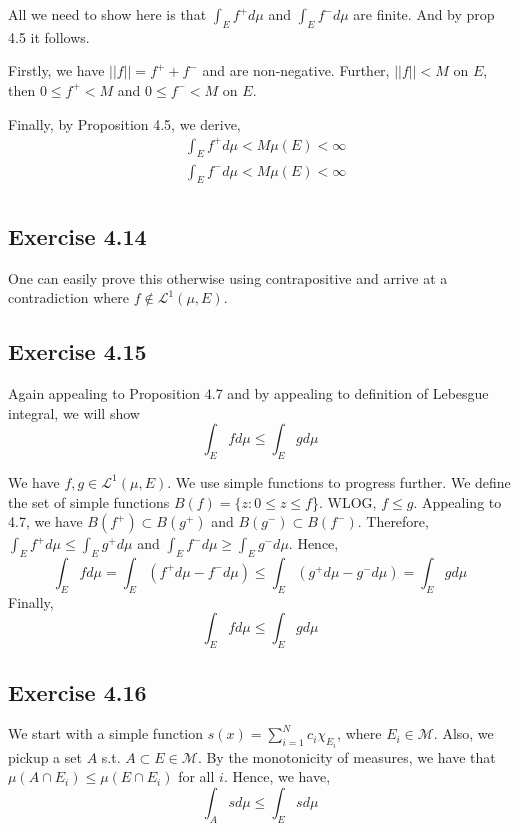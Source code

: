 \documentclass[12pt]{article}
\begin{document}
All we need to show here is that $\int_E f^+ d\mu$ and $\int_E f^- d\mu$ are finite. And by prop 4.5 it follows.

Firstly, we have $||f|| = f^+ + f^-$ and are non-negative. Further, $||f|| < M$ on $E$, then $0 \leq f^+ < M$ and $0 \leq f^- < M$ on $E$.

Finally, by Proposition 4.5, we derive,
\begin{align*}
&\int_E f^+ d\mu < M \mu(E) < \infty \\
&\int_E f^- d\mu < M \mu(E) < \infty \\
\end{align*}


\subsection{Exercise 4.14}
One can easily prove this otherwise using contrapositive and arrive at a contradiction where  $f \not\in \mathscr{L}^1(\mu,E)$.

\subsection{Exercise 4.15}

Again appealing to Proposition 4.7 and by appealing to definition of Lebesgue integral, we will show
\begin{equation}
\int_E fd\mu \leq \int_E g d\mu
\end{equation}

\vskip 1cm
We have $f,g \in \mathscr{L}^1(\mu,E)$. We use simple functions to progress further. We define the set of simple functions $B(f) = \{ z : 0 \leq z \leq f$\}. WLOG, $f \leq g$. Appealing to 4.7, we have $B(f^+) \subset B(g^+)$ and $B(g^-) \subset B(f^-)$. Therefore, $ \int_E f^+ d\mu \leq \int_E g^+ d\mu$ and $\int_E f^- d\mu \geq \int_E g^- d\mu$. Hence,
\begin{equation}
\int_E fd\mu = \int_E (f^+ d\mu -  f^- d\mu) \leq \int_E (g^+ d\mu -g^- d\mu) = \int_E g d\mu
\end{equation}
Finally,
\begin{equation}
\int_E fd\mu \leq \int_E g d\mu
\end{equation}



\subsection{Exercise 4.16}

We start with a simple function $s(x) = \sum_{i=1}^{N} c_i \chi_{E_{i}}$, where $E_i \in \mathcal{M}$. Also, we pickup a set $A$ s.t. $A \subset E \in \mathcal{M}$. By the monotonicity of measures, we have that $\mu(A \cap E_i) \leq \mu(E \cap E_i)$ for all $i$. Hence, we have,
\begin{equation} \label{ex1}
\int_A  sd\mu \leq  \int_E s d\mu
\end{equation}
\end{document}
